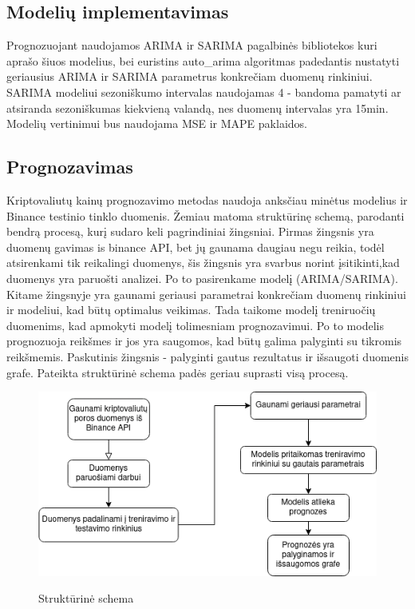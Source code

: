 \documentclass{VUMIFInfKursinis}
\begin{document}
\subsection{Modelių implementavimas}
Prognozuojant naudojamos ARIMA ir SARIMA pagalbinės bibliotekos\cite{seabold2010statsmodels} kuri aprašo šiuos modelius, 
bei euristins auto\_arima algoritmas\cite{pmdarima} padedantis nustatyti geriausius ARIMA ir SARIMA parametrus konkrečiam duomenų rinkiniui.
SARIMA modeliui sezoniškumo intervalas naudojamas 4 - bandoma pamatyti ar atsiranda sezoniškumas kiekvieną valandą, nes duomenų intervalas yra 15min.
Modelių vertinimui bus naudojama MSE ir MAPE paklaidos.

\subsection{Prognozavimas}

Kriptovaliutų kainų prognozavimo metodas naudoja anksčiau minėtus modelius ir Binance testinio tinklo duomenis. 
Žemiau matoma struktūrinę schemą, parodanti bendrą procesą, kurį sudaro keli pagrindiniai žingsniai. 
Pirmas žingsnis yra duomenų gavimas is binance API, bet jų gaunama daugiau negu reikia, todėl atsirenkami tik reikalingi duomenys, šis žingsnis yra
svarbus norint įsitikinti,kad duomenys yra paruošti analizei. Po to pasirenkame modelį (ARIMA/SARIMA).
Kitame žingsnyje yra gaunami geriausi parametrai konkrečiam duomenų rinkiniui ir modeliui, kad būtų optimalus veikimas. 
Tada taikome modelį treniruočių duomenims, kad apmokyti modelį tolimesniam prognozavimui. 
Po to modelis prognozuoja reikšmes ir jos yra saugomos, kad būtų galima palyginti su tikromis reikšmemis. Paskutinis žingsnis - palyginti gautus rezultatus
ir išsaugoti duomenis grafe. Pateikta struktūrinė schema padės geriau suprasti visą procesą.

\begin{figure}[H]
  \centering
  \includegraphics[width=\textwidth]{img/flowchart.png}
  \label{fig:forecast_flowchart}
  \caption{Struktūrinė schema}
\end{figure}
\end{document}
